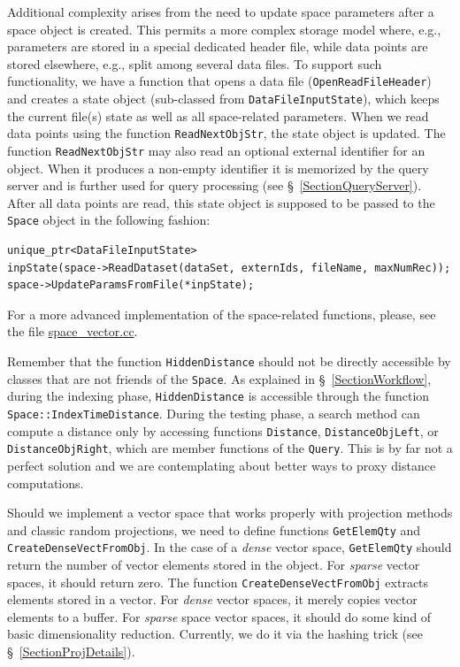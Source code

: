 \documentclass[runningheads,a4paper]{llncs}
\newcommand{\replocfile}{https://github.com/searchivarius/NonMetricSpaceLib/blob/pserv/}
\newcommand{\ttt}[1]{\texttt{#1}}
\begin{document}
Additional complexity arises from the need to update space parameters after a space object is created.  
This permits a more complex storage model where, e.g., parameters are stored
in a special dedicated header file, while data points are stored elsewhere,
e.g., split among several data files. 
To support such functionality, we have a function that opens a data file (\ttt{OpenReadFileHeader})
and creates a state object (sub-classed from \ttt{DataFileInputState}),
which keeps the current file(s) state as well as all space-related parameters. 
When we read data points using the function \ttt{ReadNextObjStr}, 
the state object is updated.
The function \ttt{ReadNextObjStr} may also read an optional external identifier for an object.
When it produces a non-empty identifier it is memorized by the query server and is further
used for query processing (see \S~\ref{SectionQueryServer}).
After all data points are read, this state object is supposed to be passed to the \ttt{Space} object
in the following fashion:
\begin{verbatim}
unique_ptr<DataFileInputState> 
inpState(space->ReadDataset(dataSet, externIds, fileName, maxNumRec));
space->UpdateParamsFromFile(*inpState);
\end{verbatim}
For a more advanced implementation of the space-related functions,
please, see the file
\href{\replocfile similarity_search/src/space/space_vector.cc}{space\_vector.cc}.

Remember that the function \ttt{HiddenDistance} should not be directly accessible 
by classes that are not friends of the \ttt{Space}.
As explained in \S~\ref{SectionWorkflow},
during the indexing phase, 
\ttt{HiddenDistance} is accessible through the function
\ttt{Space::IndexTimeDistance}.
During the testing phase, a search method can compute a distance
only by accessing functions \ttt{Distance}, \ttt{DistanceObjLeft}, or
\ttt{DistanceObjRight}, which are member functions of the \ttt{Query}.
This is by far not a perfect solution and we are contemplating about better ways to proxy distance computations. 

Should we implement a vector space that works properly with projection methods
and classic random projections, we need to define functions \ttt{GetElemQty} and \ttt{CreateDenseVectFromObj}. 
In the case of a \emph{dense} vector space, \ttt{GetElemQty}
should return the number of vector elements stored in the object.
For \emph{sparse} vector spaces, it should return zero. The function \ttt{CreateDenseVectFromObj}
extracts elements stored in a vector. For \emph{dense} vector spaces,
it merely copies vector elements to a buffer. 
For \emph{sparse} space vector spaces,
it should do some kind of basic dimensionality reduction. 
Currently, we do it via the hashing trick (see \S~\ref{SectionProjDetails}).
\end{document}
